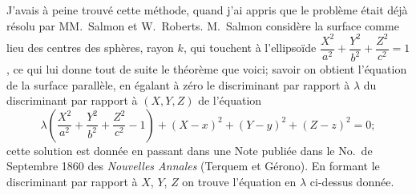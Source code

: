\documentclass[11pt,a4paper]{article}
\theoremstyle{plain}
\theoremstyle{definition}
\begin{document}
J'avais \`{a} peine trouv\'{e} cette m\'{e}thode, quand j'ai appris que le probl\`{e}me \'{e}tait d\'{e}j\`{a} r\'{e}solu par MM.~Salmon et W.~Roberts. M.~Salmon consid\`{e}re la surface comme lieu des centres des sph\`{e}res, rayon $k$, qui touchent \`{a} l'ellipso\"{i}de $\dfrac{X^2}{a^2} + \dfrac{Y^2}{b^2} + \dfrac{Z^2}{c^2} = 1$, ce qui lui donne tout de suite le th\'{e}or\`{e}me que voici; savoir on obtient l'\'{e}quation de la surface parall\`{e}le, en \'{e}galant \`{a} z\'{e}ro le discriminant par rapport \`{a} $\lambda$ du discriminant par rapport \`{a} $(X, Y, Z)$ de l'\'{e}quation
\[
\lambda\left(\frac{X^2}{a^2} + \frac{Y^2}{b^2} + \frac{Z^2}{c^2} - 1\right) + (X-x)^2 + (Y-y)^2 + (Z-z)^2 = 0;
\]
cette solution est donn\'{e}e en passant dans une Note publi\'{e}e dans le No.~de Septembre 1860 des \textit{Nouvelles Annales} (Terquem et G\'{e}rono). En formant le discriminant par rapport \`{a} $X$, $Y$, $Z$ on trouve l'\'{e}quation en $\lambda$ ci-dessus donn\'{e}e.
\end{document}
